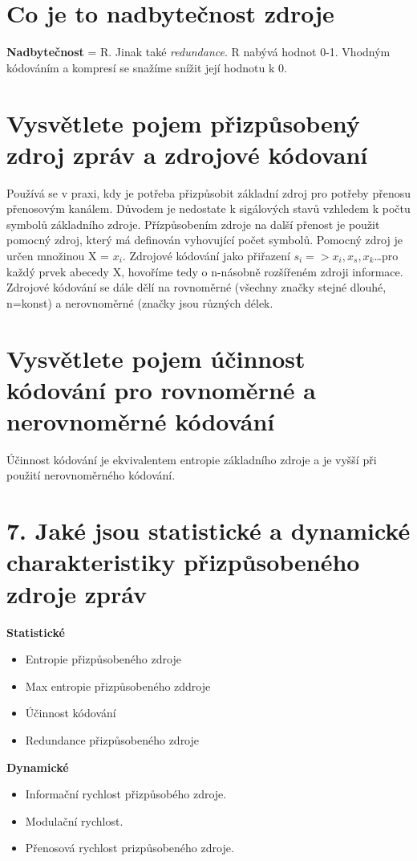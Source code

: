 \section{Co je to nadbytečnost zdroje }
\textbf{Nadbytečnost} = R.
Jinak také \textit{redundance}.
R nabývá hodnot 0-1.
Vhodným kódováním a kompresí se snažíme snížit její hodnotu k 0.

\section{Vysvětlete pojem přizpůsobený zdroj zpráv a zdrojové kódovaní}
Používá se v praxi, kdy je potřeba přizpůsobit základní zdroj pro potřeby přenosu přenosovým kanálem.
Důvodem je nedostate k sigálových stavů vzhledem k počtu symbolů základního zdroje. Přízpůsobením zdroje na další přenost je použit pomocný zdroj, který má definován vyhovující počet symbolů. Pomocný zdroj je určen množinou X = ${x_i}$.
Zdrojové kódování jako přiřazení $s_i => x_i,x_s,x_k$\dots pro každý prvek abecedy X, hovoříme tedy o n-násobně rozšířeném zdroji informace. Zdrojové kódování se dále dělí na rovnoměrné (všechny značky stejné dlouhé, n=konst) a nerovnoměrné (značky jsou různých délek.

\section{Vysvětlete pojem účinnost kódování pro rovnoměrné a nerovnoměrné kódování}
Účinnost kódování je ekvivalentem entropie základního zdroje a je vyšší při použití nerovnoměrného kódování.

\section{7.	Jaké jsou statistické a dynamické charakteristiky přizpůsobeného zdroje zpráv}
\textbf{Statistické}
\begin{itemize}
    \item Entropie přizpůsobeného zdroje
    \item Max entropie přizpůsobeného zddroje
    \item Účinnost kódování
    \item Redundance přizpůsobeného zdroje
\end{itemize}
\textbf{Dynamické}
\begin{itemize}
    \item Informační rychlost přizpůsobého zdroje.
    \item Modulační rychlost.
    \item Přenosová rychlost prizpůsobeného zdroje.
    
\end{itemize}

